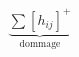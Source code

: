 \documentclass[preview]{standalone}
\begin{document}
\begin{align*}
\underbrace{\sum [h_{ij}]^+}_{\text{dommage}}
\end{align*}
\end{document}

